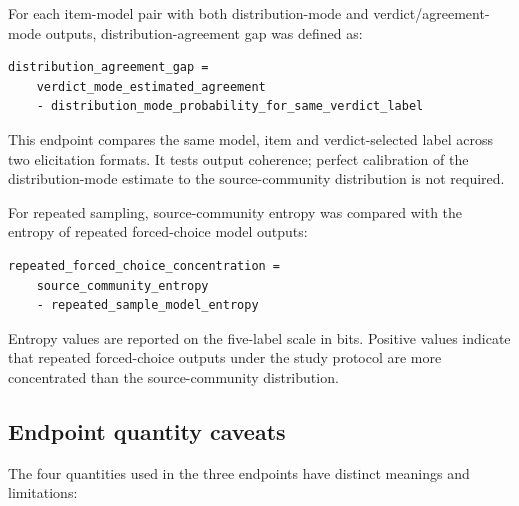\documentclass[11pt]{article}
\begin{document}
For each item-model pair with both distribution-mode and verdict/agreement-mode outputs, distribution-agreement gap was defined as:

\begin{verbatim}
distribution_agreement_gap =
    verdict_mode_estimated_agreement
    - distribution_mode_probability_for_same_verdict_label
\end{verbatim}

This endpoint compares the same model, item and verdict-selected label across two elicitation formats. It tests output coherence; perfect calibration of the distribution-mode estimate to the source-community distribution is not required.

For repeated sampling, source-community entropy was compared with the entropy of repeated forced-choice model outputs:

\begin{verbatim}
repeated_forced_choice_concentration =
    source_community_entropy
    - repeated_sample_model_entropy
\end{verbatim}

Entropy values are reported on the five-label scale in bits. Positive values indicate that repeated forced-choice outputs under the study protocol are more concentrated than the source-community distribution.

\subsection{Endpoint quantity caveats}

The four quantities used in the three endpoints have distinct meanings and limitations:
\end{document}
